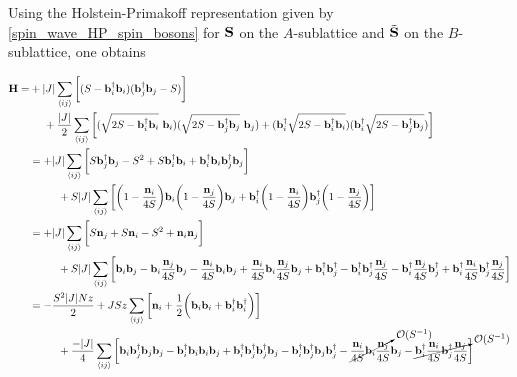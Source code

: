\documentclass{homework}
\begin{document}
Using the Holstein-Primakoff representation given by \cref{spin_wave_HP_spin_bosons} for ${\bf S}$ on the $A$-sublattice and $\tilde{{\bf S}}$ on the $B$-sublattice, one obtains 

\begin{equation}
    \begin{split}
    {\bf H} =& + |J| \sum_{\langle ij \rangle} 
    \bigg[ 
    (S - {\bf b}_i^\dagger {\bf b}_i)({\bf b}_j^\dagger {\bf b}_j - S)
    \bigg] \\
    & \textnormal{ } \textnormal{ } \textnormal{ } \textnormal{ } + 
    \frac{|J|}{2} \sum_{\langle ij \rangle} 
    \bigg[ 
    (\sqrt{2S - {\bf b}_i^\dagger {\bf b}_i} \textnormal{ } {\bf b}_i)(\sqrt{2S - {\bf b}_j^\dagger {\bf b}_j} \textnormal{ } {\bf b}_j ) 
    + 
    ({\bf b}_i^\dagger\sqrt{2S - {\bf b}_i^\dagger {\bf b}_i} ) ({\bf b}_i^\dagger\sqrt{2S - {\bf b}_j^\dagger {\bf b}_j})
    \bigg] \\
    &= + |J| \sum_{\langle ij \rangle} 
    \bigg[ 
    S {\bf b}_j^\dagger {\bf b}_j - S^2 + S{\bf b}_i^\dagger {\bf b}_i + {\bf b}_i^\dagger {\bf b}_i {\bf b}_j^\dagger {\bf b}_j
    \bigg] \\
    & \textnormal{ } \textnormal{ } \textnormal{ } \textnormal{ } \textnormal{ } \textnormal{ } \textnormal{ } \textnormal{ } + 
    {S|J|} \sum_{\langle ij \rangle} 
    \bigg[  
    \bigg(1-\frac{{\bf n}_i}{4S}\bigg) {\bf b}_i 
    \bigg(1-\frac{{\bf n}_j}{4S}\bigg) {\bf b}_j 
    + 
     {\bf b}_i^\dagger \bigg(1-\frac{{\bf n}_i}{4S}\bigg)
     {\bf b}_j^\dagger \bigg(1-\frac{{\bf n}_j}{4S}\bigg)
    \bigg] \\
    &= + |J| \sum_{\langle ij \rangle} 
    \bigg[ 
    S {\bf n}_j + S {\bf n}_i - S^2 + {\bf n}_i {\bf n}_j 
    \bigg] \\ 
    & \textnormal{ } \textnormal{ } \textnormal{ } \textnormal{ } \textnormal{ } \textnormal{ } \textnormal{ } \textnormal{ } + 
    {S|J|} \sum_{\langle ij \rangle} 
    \bigg[  
    {\bf b}_i{\bf b}_j - {\bf b}_i \frac{{\bf n}_j}{4S} {\bf b}_j - \frac{{\bf n}_i}{4S} {\bf b}_i {\bf b}_j + \frac{{\bf n}_i}{4S} {\bf b}_i \frac{{\bf n}_j}{4S} {\bf b}_j 
    + 
    {\bf b}_i^\dagger{\bf b}_j^\dagger - {\bf b}_i^\dagger{\bf b}_j^\dagger \frac{{\bf n}_j}{4S} - {\bf b}_i^\dagger \frac{{\bf n}_j}{4S} {\bf b}_j^\dagger + {\bf b}_i^\dagger \frac{{\bf n}_i}{4S}{\bf b}_j^\dagger\frac{{\bf n}_j}{4S}
    \bigg] \\
    &= -\frac{S^2 |J| N z}{2} + J S z\sum_{\langle ij \rangle} 
    \bigg[
    {\bf n}_i + \frac{1}{2} 
    \bigg(
    {\bf b}_i {\bf b}_i + {\bf b}_i^\dagger {\bf b}_i^\dagger \bigg)
    \bigg] \\
    & \textnormal{ } \textnormal{ } \textnormal{ } \textnormal{ } \textnormal{ } \textnormal{ } \textnormal{ } \textnormal{ } + \frac{-|J|}{4} \sum_{\langle ij \rangle} 
    \bigg[
    {\bf b}_i {\bf b}_j^\dagger {\bf b}_j {\bf b}_j 
    - {\bf b}_i^\dagger {\bf b}_i {\bf b}_i {\bf b}_j + {\bf b}_i^\dagger {\bf b}_j^\dagger {\bf b}_j^\dagger {\bf b}_j - {\bf b}_i^\dagger {\bf b}_j^\dagger {\bf b}_j {\bf b}_j^\dagger - \cancelto{\mathcal{O}(S^{-1})}{\frac{{\bf n}_i}{4S} {\bf b}_i \frac{{\bf n}_j}{4S}} {\bf b}_j - \cancelto{\mathcal{O}(S^{-1})}{{\bf b}_i^\dagger \frac{{\bf n}_i}{4S}{\bf b}_j^\dagger\frac{{\bf n}_j}{4S}}
    \bigg] \\
    \end{split}
\end{equation}
\end{document}

